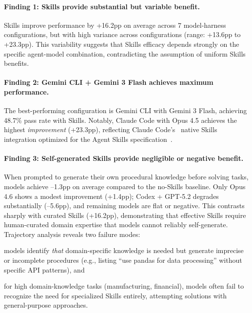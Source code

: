 \paragraph{Finding 1: Skills provide substantial but variable benefit.} Skills improve performance by +16.2pp on average across 7 model-harness configurations, but with high variance across configurations (range: +13.6pp to +23.3pp). This variability suggests that Skills efficacy depends strongly on the specific agent-model combination, contradicting the assumption of uniform Skills benefits.

\paragraph{Finding 2: Gemini CLI + Gemini 3 Flash achieves maximum performance.} The best-performing configuration is Gemini CLI with Gemini 3 Flash, achieving 48.7\% pass rate with Skills. Notably, Claude Code with Opus 4.5 achieves the highest \emph{improvement} (+23.3pp), reflecting Claude Code's~\citep{anthropic2025claudecode} native Skills integration optimized for the Agent Skills specification~\citep{anthropic2025agentskills}.

\vspace{-14pt}
\paragraph{Finding 3: Self-generated Skills provide negligible or negative benefit.}
When prompted to generate their own procedural knowledge before solving tasks, models achieve --1.3pp on average compared to the no-Skills baseline.
Only Opus 4.6 shows a modest improvement (+1.4pp); Codex + GPT-5.2 degrades substantially (--5.6pp), and remaining models are flat or negative.
This contrasts sharply with curated Skills (+16.2pp), demonstrating that effective Skills require human-curated domain expertise that models cannot reliably self-generate.
Trajectory analysis reveals two failure modes:
\begin{enumerate*}[label=(\arabic*)]
\item models identify \emph{that} domain-specific knowledge is needed but generate imprecise or incomplete procedures (e.g., listing ``use pandas for data processing'' without specific API patterns), and
\item for high domain-knowledge tasks (manufacturing, financial), models often fail to recognize the need for specialized Skills entirely, attempting solutions with general-purpose approaches.
\end{enumerate*}

